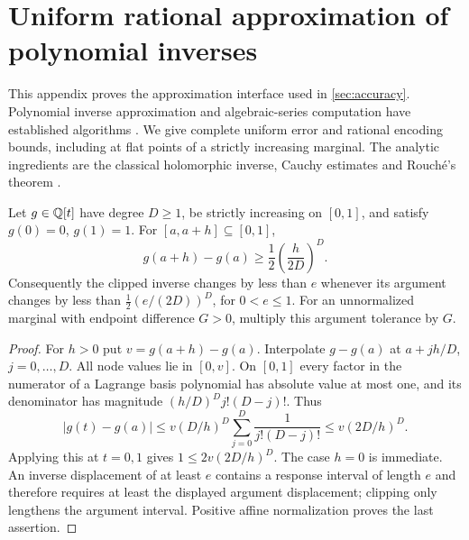 \section{Uniform rational approximation of polynomial inverses}
\label{app:inverse}

This appendix proves the approximation interface used in
\cref{sec:accuracy}. Polynomial inverse approximation and algebraic-series
computation have established algorithms \cite{Farouki2000,Walsh2000}.
We give complete uniform error and rational encoding bounds, including at
flat points of a strictly increasing marginal. The analytic ingredients are
the classical holomorphic inverse, Cauchy estimates and Rouch\'e's theorem
\cite{DLMFComplex}.

\begin{lemma}\label{lem:inverse-modulus}
Let $g\in\mathbb Q[t]$ have degree $D\ge1$, be strictly increasing on $[0,1]$,
and satisfy $g(0)=0$, $g(1)=1$. For $[a,a+h]\subseteq[0,1]$,
\begin{equation}\label{eq:inverse-increment}
             g(a+h)-g(a)\ge\frac12\left(\frac{h}{2D}\right)^D.
\end{equation}
Consequently the clipped inverse changes by less than $e$ whenever its
argument changes by less than $\frac12(e/(2D))^D$, for $0<e\le1$.
For an unnormalized marginal with endpoint difference $G>0$, multiply
this argument tolerance by $G$.
\end{lemma}
\begin{proof}
For $h>0$ put $v=g(a+h)-g(a)$. Interpolate $g-g(a)$ at
$a+jh/D$, $j=0,\ldots,D$. All node values lie in $[0,v]$.
On $[0,1]$ every factor in the numerator of a Lagrange basis polynomial
has absolute value at most one, and its denominator has magnitude
$(h/D)^D j!(D-j)!$. Thus
\[
 |g(t)-g(a)|\le v(D/h)^D\sum_{j=0}^D\frac1{j!(D-j)!}
              \le v(2D/h)^D.
\]
Applying this at $t=0,1$ gives $1\le2v(2D/h)^D$. The case $h=0$
is immediate. An inverse displacement of at least $e$ contains a
response interval of length $e$ and therefore requires at least the
displayed argument displacement; clipping only lengthens the argument
interval. Positive affine normalization proves the last assertion.
\end{proof}

